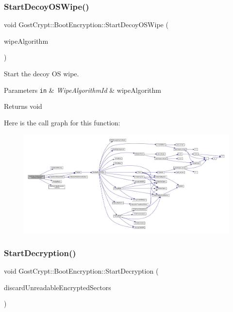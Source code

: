 \subsubsection{\texorpdfstring{Start\+Decoy\+O\+S\+Wipe()}{StartDecoyOSWipe()}}
{\footnotesize\ttfamily void Gost\+Crypt\+::\+Boot\+Encryption\+::\+Start\+Decoy\+O\+S\+Wipe (\begin{DoxyParamCaption}\item[{Wipe\+Algorithm\+Id}]{wipe\+Algorithm }\end{DoxyParamCaption})}



Start the decoy OS wipe. 


\begin{DoxyParams}[1]{Parameters}
\mbox{\tt in}  & {\em Wipe\+Algorithm\+Id} & wipe\+Algorithm \\
\hline
\end{DoxyParams}
\begin{DoxyReturn}{Returns}
void 
\end{DoxyReturn}
Here is the call graph for this function\+:
\nopagebreak
\begin{figure}[H]
\begin{center}
\leavevmode
\includegraphics[width=350pt]{class_gost_crypt_1_1_boot_encryption_ae96eefda4ed624bd336f89b4a261b2c1_cgraph}
\end{center}
\end{figure}
\mbox{\label{class_gost_crypt_1_1_boot_encryption_a1397fa6ebb63da2ca0a636cfa8262858}} 
\subsubsection{\texorpdfstring{Start\+Decryption()}{StartDecryption()}}
{\footnotesize\ttfamily void Gost\+Crypt\+::\+Boot\+Encryption\+::\+Start\+Decryption (\begin{DoxyParamCaption}\item[{B\+O\+OL}]{discard\+Unreadable\+Encrypted\+Sectors }\end{DoxyParamCaption})}



